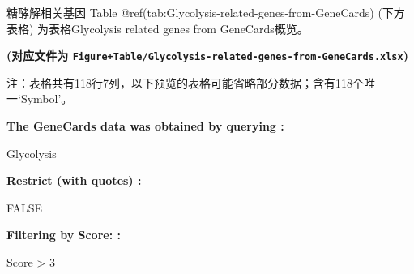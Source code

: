 \documentclass[
  ignorenonframetext,
]{beamer}
\begin{document}
\begin{frame}[fragile]{糖酵解相关基因}
\protect\hypertarget{ux7cd6ux9175ux89e3ux76f8ux5173ux57faux56e0}{}
Table @ref(tab:Glycolysis-related-genes-from-GeneCards) (下方表格)
为表格Glycolysis related genes from GeneCards概览。

\textbf{(对应文件为
\texttt{Figure+Table/Glycolysis-related-genes-from-GeneCards.xlsx})}

\begin{center}\begin{tcolorbox}[colback=gray!10, colframe=gray!50, width=0.9\linewidth, arc=1mm, boxrule=0.5pt]注：表格共有118行7列，以下预览的表格可能省略部分数据；含有118个唯一`Symbol'。
\end{tcolorbox}
\end{center}\begin{center}\begin{tcolorbox}[colback=gray!10, colframe=gray!50, width=0.9\linewidth, arc=1mm, boxrule=0.5pt]
\textbf{
The GeneCards data was obtained by querying
:}

\vspace{0.5em}

    Glycolysis

\vspace{2em}


\textbf{
Restrict (with quotes)
:}

\vspace{0.5em}

    FALSE

\vspace{2em}


\textbf{
Filtering by Score:
:}

\vspace{0.5em}

    Score > 3

\vspace{2em}
\end{tcolorbox}
\end{center}


\end{frame}
\end{document}
